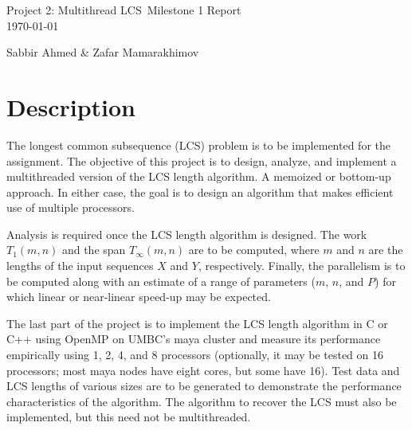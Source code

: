 \documentclass[usletter, 11pt]{extarticle}
\newcommand{\project}{Project 2: Multithread LCS}
\newcommand{\members}{Sabbir Ahmed \& Zafar Mamarakhimov}
\begin{document}
    \begin{titlepage}

        \vspace*{\fill} %
        \begin{center}

            {\LARGE \project~Milestone 1 Report}\\ [1.5cm]

            \today

            \vspace*{\fill}

            \members

        \end{center}
        \vspace*{\fill} %

    \end{titlepage}

    \section{Description} The longest common subsequence (LCS) problem is to be
    implemented for the assignment. The objective of this project is to design,
    analyze, and implement a multithreaded version of the LCS length algorithm.
    A memoized or bottom-up approach. In either case, the goal is to design an
    algorithm that makes efficient use of multiple processors.

    Analysis is required once the LCS length algorithm is designed. The work
    $T_{1}(m, n)$ and the span $T_{\infty}(m, n)$ are to be computed, where $m$
    and $n$ are the lengths of the input sequences $X$ and $Y$, respectively.
    Finally, the parallelism is to be computed along with an estimate of a
    range of parameters ($m$, $n$, and $P$) for which linear or near-linear
    speed-up may be expected.

    The last part of the project is to implement the LCS length algorithm in C
    or C++ using OpenMP on UMBC's maya cluster and measure its performance
    empirically using 1, 2, 4, and 8 processors (optionally, it may be tested
    on 16 processors; most maya nodes have eight cores, but some have 16). Test
    data and LCS lengths of various sizes are to be generated to demonstrate
    the performance characteristics of the algorithm. The algorithm to recover
    the LCS must also be implemented, but this need not be multithreaded.
\end{document}
